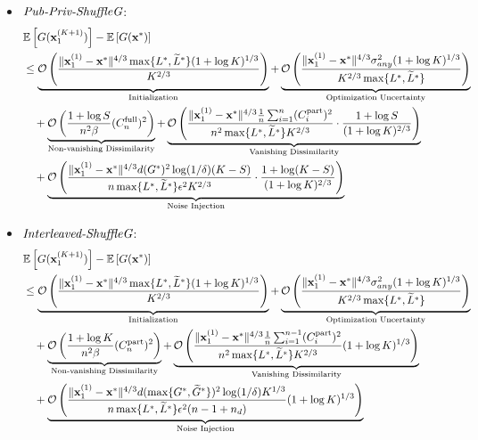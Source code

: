 \begin{itemize}
    \item $\textit{Pub-Priv-ShuffleG}$:
    \begin{align*}
        &\mathbb{E}\left[ G({\mathbf{x}}_1^{(K+1)}) \right] - \mathbb{E}\left[G({\mathbf{x}}^*)\right]\\
        &\leq \underbrace{ {\mathcal{O}} \left( 
                \frac{\|{\mathbf{x}}_1^{(1)} - {\mathbf{x}}^*\|^{4/3} \max\{L^{*}, \widetilde{L}^{*}\} (1+\log K)^{1/3}}{K^{2/3}} \right)
            }_{\text{Initialization}}
        + \underbrace{ {\mathcal{O}} \left( 
            \frac{\|{\mathbf{x}}_1^{(1)} - {\mathbf{x}}^*\|^{4/3} \sigma_{any}^2 (1+\log K)^{1/3}}
            {K^{2/3} \max\{L^{*}, \widetilde{L}^{*} \} } 
            \right)
        }_{\text{Optimization Uncertainty}}\\
        &\quad + \underbrace{ {\mathcal{O}}\left(
            \frac{1 + \log S}{n^2 \beta}(C_n^{\text{full}})^2 \right)
        }_{\text{Non-vanishing Dissimilarity}}
        + \underbrace{ 
            {\mathcal{O}}\left( \frac{\|{\mathbf{x}}_1^{(1)} - {\mathbf{x}}^{*}\|^{4/3} \frac{1}{n}\sum_{i=1}^{n}(C_i^{\text{part}})^2}
            {n^2 \max\{L^{*}, \widetilde{L}^{*}\} K^{2/3} } \cdot \frac{1 + \log S}{(1+\log K)^{2/3}} \right)
        }_{\text{Vanishing Dissimilarity}} \\
        &\quad + \underbrace{ {\mathcal{O}}\left( \frac{\|{\mathbf{x}}_1^{(1)} - {\mathbf{x}}^{*}\|^{4/3} d (G^{*})^2  \log (1/\delta) (K-S)}{n \max\{L^{*}, \widetilde{L}^{*}\} {\epsilon}^2 K^{2/3}} \cdot \frac{1 + \log (K - S)}{(1+\log K)^{2/3}} \right)
        }_{\text{Noise Injection}}
    \end{align*}


    \item $\textit{Interleaved-ShuffleG}$:
    \begin{align*}
        &\mathbb{E}\left[ G({\mathbf{x}}_1^{(K+1)}) \right] - \mathbb{E}\left[G({\mathbf{x}}^*)\right]\\
        &\leq \underbrace{ {\mathcal{O}} \left( 
                \frac{\|{\mathbf{x}}_1^{(1)} - {\mathbf{x}}^*\|^{4/3} \max\{L^{*}, \widetilde{L}^{*}\} (1+\log K)^{1/3}}{K^{2/3}} \right)
            }_{\text{Initialization}}
        + \underbrace{ {\mathcal{O}} \left( 
            \frac{\|{\mathbf{x}}_1^{(1)} - {\mathbf{x}}^*\|^{4/3} \sigma_{any}^2 (1+\log K)^{1/3}}
            {K^{2/3} \max\{L^{*}, \widetilde{L}^{*} \} } 
            \right)
        }_{\text{Optimization Uncertainty}}\\
        &\quad + \underbrace{ {\mathcal{O}}\left( \frac{1 + \log K}{n^2 \beta} (C_n^{\text{part}})^{2} \right) 
        }_{\text{Non-vanishing Dissimilarity}}
        + \underbrace{ {\mathcal{O}}\left( \frac{\|{\mathbf{x}}_1^{(1)} -{\mathbf{x}}^{*}\|^{4/3} \frac{1}{n}\sum_{i=1}^{n-1}(C_{i}^{\text{part}})^2}{n^2 \max\{L^{*}, \widetilde{L}^{*} \} K^{2/3}  } (1+\log K)^{1/3} \right)
        }_{\text{Vanishing Dissimilarity}}\\
        &\quad + \underbrace{ {\mathcal{O}}\left( \frac{\|{\mathbf{x}}_1^{(1)} - {\mathbf{x}}^{*}\|^{4/3} d (\max\{G^{*}, \widetilde{G}^{*}\})^2 \log (1/\delta) K^{1/3}}
        {n \max\{L^{*}, \widetilde{L}^{*} \} {\epsilon}^2 (n-1+n_d)} (1+\log K)^{1/3} \right)
        }_{\text{Noise Injection}}
    \end{align*}
\end{itemize}



